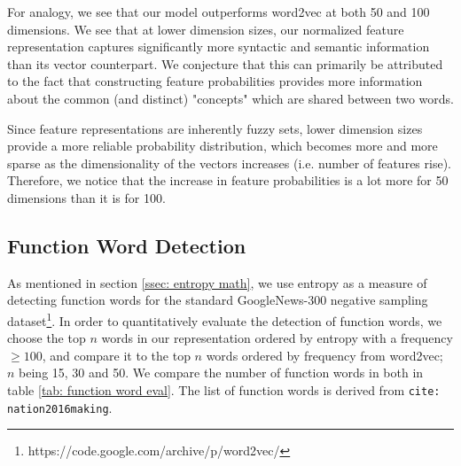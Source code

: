 \documentclass[11pt]{book}
\newcommand{\citet}[1]{\texttt{cite: #1}}
\begin{document}

For analogy, we see that our model outperforms word2vec at both 50 and 100
dimensions. We see that at lower dimension sizes, our normalized feature
representation captures significantly more syntactic and semantic information
than its vector counterpart. We conjecture that this can primarily be
attributed to the fact that constructing feature probabilities provides more
information about the common (and distinct) "concepts" which are shared between
two words. 

Since feature representations are inherently fuzzy sets, lower dimension sizes
provide a more reliable probability distribution, which becomes more and more
sparse as the dimensionality of the vectors increases (i.e. number of features
rise). Therefore, we notice that the increase in feature probabilities is a lot
more for 50 dimensions than it is for 100.

\subsection{Function Word Detection}
\label{ssec: function}

As mentioned in section \ref{ssec: entropy math}, we use entropy as a measure
of detecting function words for the standard GoogleNews-300 negative sampling
dataset\footnote{https://code.google.com/archive/p/word2vec/}. In order to
quantitatively evaluate the detection of function words, we choose the top $n$
words in our representation ordered by entropy with a frequency $\geq 100$, and
compare it to the top $n$ words ordered by frequency from word2vec; $n$ being
15, 30 and 50. We compare the number of function words in both in table
\ref{tab: function word eval}. The list of function words is derived from
\citet{nation2016making}.
\end{document}
